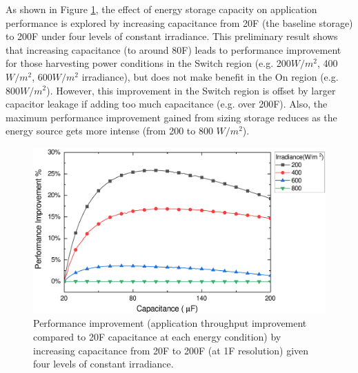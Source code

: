 As shown in Figure \ref{Figure:VaryCapThrp}, the effect of energy storage capacity on application performance is explored by increasing capacitance from 20\textmu F (the baseline storage) to 200\textmu F under four levels of constant irradiance. This preliminary result shows that increasing capacitance (to around 80\textmu F) leads to performance improvement for those harvesting power conditions in the Switch region (e.g. 200$W/m^2$, 400$W/m^2$, 600$W/m^2$ irradiance), but does not make benefit in the On region (e.g. 800$W/m^2$). However, this improvement in the Switch region is offset by larger capacitor leakage if adding too much capacitance (e.g. over 200\textmu F). Also, the maximum performance improvement gained from sizing storage reduces as the energy source gets more intense (from 200 to 800 $W/m^2$).

\begin{figure}[H]
    \centering
    \includegraphics[width=13cm]{figure/work1/VaryCapThrp}
    \caption{Performance improvement (application throughput improvement compared to 20\textmu F capacitance at each energy condition) by increasing capacitance from 20\textmu F to 200\textmu F (at 1\textmu F resolution) given four levels of constant irradiance. }
    \label{Figure:VaryCapThrp}
\end{figure}

